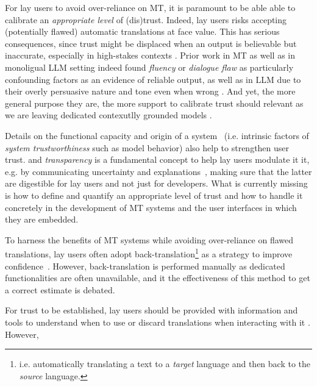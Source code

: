 For lay users to avoid over-reliance on MT, it is paramount to be able able to calibrate an \emph{appropriate level} of (dis)trust. 
Indeed, lay users risks accepting (potentially flawed) automatic translations at face value. 
This has serious consequences, since trust might be displaced when an output is believable but inaccurate, especially in high-stakes contexts 
\citep{mehandru-etal-2023-physician}. Prior work in MT as well as in monoligual LLM setting indeed found \textit{fluency} or \textit{dialogue flaw} as particularly confounding factors as an evidence of reliable output, 
as well as in LLM due to their overly persuasive nature and tone even when wrong \citep{xiong2024llmsexpressuncertaintyempirical, trust}. And yet, the more general purpose they are, the more support to calibrate trust should relevant as we are leaving dedicated contexutlly grounded models \citep{deng2022generalpurposemachinetranslation, litschko-etal-2023-establishing}. 

Details on the functional capacity and origin of a system~\citep{davis-1979-applications} (i.e. intrinsic factors of \emph{system trustworthiness} such as model behavior) also help to strengthen user trust.
and \emph{transparency} is a fundamental concept to help lay users modulate it it, e.g. by communicating uncertainty and explanations~\citep{liao2023aitransparencyagellms}, making sure that the latter are 
digestible for lay users and not just for developers. What is currently missing is how to define and quantify an appropriate level of trust and how to handle it concretely in the development of MT systems and the user interfaces in which they are embedded.










To harness the benefits of MT systems while avoiding over-reliance on flawed translations, lay users often adopt 
back-translation\footnote{i.e. automatically translating a text to a \emph{target} language and then back to the \emph{source} language.} as a strategy to improve confidence~\citep{back-2007, zouhar-etal-2021-backtranslation,mehandru-etal-2023-physician}. However, 
back-translation is performed manually as dedicated functionalities are often unavailable, and it the effectiveness of this method to get a correct estimate is debated. 

For trust to be established, lay users should be provided with 
information and tools to understand when to use or discard translations when interacting with it 
\citep{litschko-etal-2023-establishing}. 
However, 

